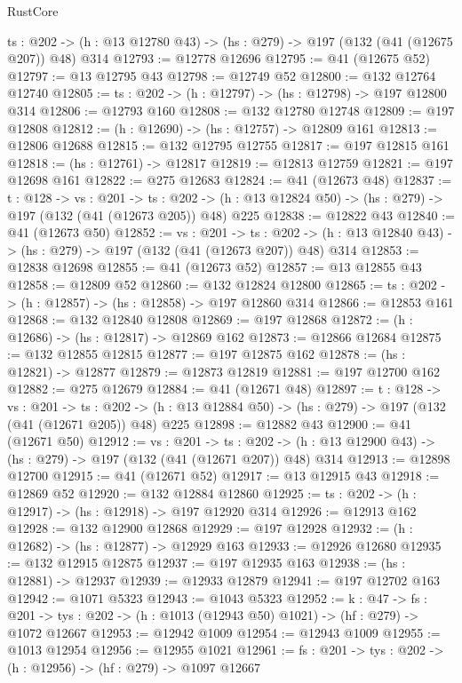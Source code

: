 \begin{lexlean}{RustCore}
\begin{coremodule}
  {ts : @202} -> (h : @13 @12780 @43) -> (hs : @279) -> @197 (@132 (@41 (@12675 @207)) @48) @314
@12793 := @12778 @12696
@12795 := @41 (@12675 @52)
@12797 := @13 @12795 @43
@12798 := @12749 @52
@12800 := @132 @12764 @12740
@12805 := {ts : @202} -> (h : @12797) -> (hs : @12798) -> @197 @12800 @314
@12806 := @12793 @160
@12808 := @132 @12780 @12748
@12809 := @197 @12808
@12812 := (h : @12690) -> (hs : @12757) -> @12809 @161
@12813 := @12806 @12688
@12815 := @132 @12795 @12755
@12817 := @197 @12815 @161
@12818 := (hs : @12761) -> @12817
@12819 := @12813 @12759
@12821 := @197 @12698 @161
@12822 := @275 @12683
@12824 := @41 (@12673 @48)
@12837 := {t : @128} ->
  {vs : @201} ->
  {ts : @202} -> (h : @13 @12824 @50) -> (hs : @279) -> @197 (@132 (@41 (@12673 @205)) @48) @225
@12838 := @12822 @43
@12840 := @41 (@12673 @50)
@12852 := {vs : @201} ->
  {ts : @202} -> (h : @13 @12840 @43) -> (hs : @279) -> @197 (@132 (@41 (@12673 @207)) @48) @314
@12853 := @12838 @12698
@12855 := @41 (@12673 @52)
@12857 := @13 @12855 @43
@12858 := @12809 @52
@12860 := @132 @12824 @12800
@12865 := {ts : @202} -> (h : @12857) -> (hs : @12858) -> @197 @12860 @314
@12866 := @12853 @161
@12868 := @132 @12840 @12808
@12869 := @197 @12868
@12872 := (h : @12686) -> (hs : @12817) -> @12869 @162
@12873 := @12866 @12684
@12875 := @132 @12855 @12815
@12877 := @197 @12875 @162
@12878 := (hs : @12821) -> @12877
@12879 := @12873 @12819
@12881 := @197 @12700 @162
@12882 := @275 @12679
@12884 := @41 (@12671 @48)
@12897 := {t : @128} ->
  {vs : @201} ->
  {ts : @202} -> (h : @13 @12884 @50) -> (hs : @279) -> @197 (@132 (@41 (@12671 @205)) @48) @225
@12898 := @12882 @43
@12900 := @41 (@12671 @50)
@12912 := {vs : @201} ->
  {ts : @202} -> (h : @13 @12900 @43) -> (hs : @279) -> @197 (@132 (@41 (@12671 @207)) @48) @314
@12913 := @12898 @12700
@12915 := @41 (@12671 @52)
@12917 := @13 @12915 @43
@12918 := @12869 @52
@12920 := @132 @12884 @12860
@12925 := {ts : @202} -> (h : @12917) -> (hs : @12918) -> @197 @12920 @314
@12926 := @12913 @162
@12928 := @132 @12900 @12868
@12929 := @197 @12928
@12932 := (h : @12682) -> (hs : @12877) -> @12929 @163
@12933 := @12926 @12680
@12935 := @132 @12915 @12875
@12937 := @197 @12935 @163
@12938 := (hs : @12881) -> @12937
@12939 := @12933 @12879
@12941 := @197 @12702 @163
@12942 := @1071 @5323
@12943 := @1043 @5323
@12952 := {k : @47} ->
  {fs : @201} -> {tys : @202} -> (h : @1013 (@12943 @50) @1021) -> (hf : @279) -> @1072 @12667
@12953 := @12942 @1009
@12954 := @12943 @1009
@12955 := @1013 @12954
@12956 := @12955 @1021
@12961 := {fs : @201} -> {tys : @202} -> (h : @12956) -> (hf : @279) -> @1097 @12667

\end{coremodule}
\end{lexlean}

